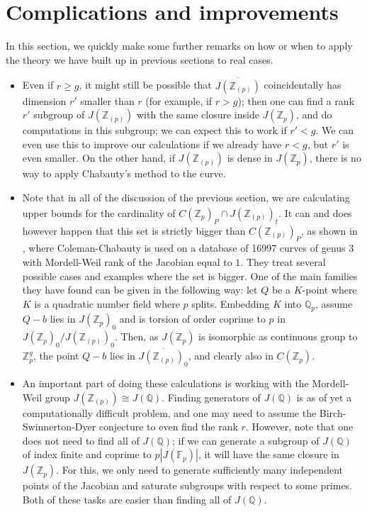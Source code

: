 \documentclass[12pt]{article}
\newcommand{\Z}{\mathbb{Z}}
\newcommand{\Q}{\mathbb{Q}}
\newcommand{\F}{\mathbb{F}}
\theoremstyle{plain}
\theoremstyle{definition}
\theoremstyle{remark}
\begin{document}
\section{Complications and improvements}
\label{section:remarks}
In this section, we quickly make some further remarks on how or when to apply the theory we have built up in previous sections to real cases.
\begin{itemize} 
\item Even if $r \geq g$, it might still be possible that $\overline{J(\Z_{(p)})}$ coincidentally has dimension $r'$ smaller than $r$ (for example, if $r > g$); then one can find a rank $r'$ subgroup of $J(\Z_{(p)})$ with the same closure inside $J(\Z_p)$, and do computations in this subgroup; we can expect this to work if $r' < g$. We can even use this to improve our calculations if we already have $r < g$, but $r'$ is even smaller. On the other hand, if $J(\Z_{(p)})$ is dense in $J(\Z_p)$, there is no way to apply Chabauty's method to the curve.
\item Note that in all of the discussion of the previous section, we are calculating upper bounds for the cardinality of $C(\Z_p)_P \cap \overline{J(\Z_{(p)})_t}$. It can and does however happen that this set is strictly bigger than $C(\Z_{(p)})_P$, as shown in \cite{Balakrishnan19}, where Coleman-Chabauty is used on a database of 16997 curves of genus $3$ with Mordell-Weil rank of the Jacobian equal to $1$. They treat several possible cases and examples where the set is bigger. One of the main families they have found can be given in the following way: let $Q$ be a $K$-point where $K$ is a quadratic number field where $p$ splits. Embedding $K$ into $\Q_p$, assume $Q-b$ lies in $J(\Z_p)_0$ and is torsion of order coprime to $p$ in $J(\Z_p)_0/J(\Z_{(p)})_0$. Then, as $J(\Z_p)$ is isomorphic as continuous group to $\Z_p^g$, the point $Q-b$ lies in $\overline{J(\Z_{(p)})_0}$, and clearly also in $C(\Z_p)$.
\item An important part of doing these calculations is working with the Mordell-Weil group $J(\Z_{(p)}) \cong J(\Q)$. Finding generators of $J(\Q)$ is as of yet a computationally difficult problem, and one may need to assume the Birch-Swinnerton-Dyer conjecture to even find the rank $r$. However, note that one does not need to find all of $J(\Q)$; if we can generate a subgroup of $J(\Q)$ of index finite and coprime to $p|J(\F_p)|$, it will have the same closure in $J(\Z_p)$. For this, we only need to generate sufficiently many independent points of the Jacobian and saturate subgroups with respect to some primes. Both of these tasks are easier than finding all of $J(\Q)$.

\end{itemize}
\end{document}
